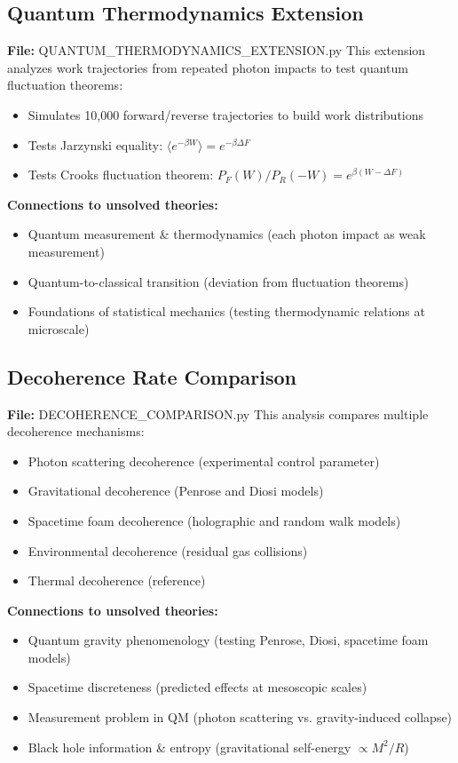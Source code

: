 \documentclass[11pt]{article}
\begin{document}
\subsection{Quantum Thermodynamics Extension}
\textbf{File:} QUANTUM\_THERMODYNAMICS\_EXTENSION.py
This extension analyzes work trajectories from repeated photon impacts to test quantum fluctuation theorems:
\begin{itemize}
\item Simulates 10,000 forward/reverse trajectories to build work distributions
\item Tests Jarzynski equality: $\langle e^{-\beta W} \rangle = e^{-\beta \Delta F}$
\item Tests Crooks fluctuation theorem: $P_F(W)/P_R(-W) = e^{\beta(W-\Delta F)}$
\end{itemize}
\textbf{Connections to unsolved theories:}
\begin{itemize}
\item Quantum measurement \& thermodynamics (each photon impact as weak measurement)
\item Quantum-to-classical transition (deviation from fluctuation theorems)
\item Foundations of statistical mechanics (testing thermodynamic relations at microscale)
\end{itemize}

\subsection{Decoherence Rate Comparison}
\textbf{File:} DECOHERENCE\_COMPARISON.py
This analysis compares multiple decoherence mechanisms:
\begin{itemize}
\item Photon scattering decoherence (experimental control parameter)
\item Gravitational decoherence (Penrose and Diosi models)
\item Spacetime foam decoherence (holographic and random walk models)
\item Environmental decoherence (residual gas collisions)
\item Thermal decoherence (reference)
\end{itemize}
\textbf{Connections to unsolved theories:}
\begin{itemize}
\item Quantum gravity phenomenology (testing Penrose, Diosi, spacetime foam models)
\item Spacetime discreteness (predicted effects at mesoscopic scales)
\item Measurement problem in QM (photon scattering vs. gravity-induced collapse)
\item Black hole information \& entropy (gravitational self-energy $\propto M^2/R$)
\end{itemize}
\end{document}
